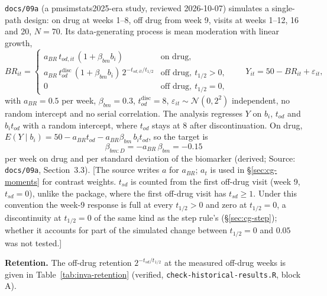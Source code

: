 \documentclass[11pt]{article}
\newcommand{\note}[1]{\textcolor{blue!60!black}{\small [#1]}}
\newcommand{\code}[1]{\texttt{#1}}
\begin{document}
\code{docs/09a} (a pmsimstats2025-era study, reviewed 2026-10-07)
simulates a single-path design: on drug at weeks 1--8, off drug from
week 9, visits at weeks 1--12, 16 and 20, $N = 70$. Its
data-generating process is mean moderation with linear growth,
\begin{equation}
BR_{it} = \begin{cases}
  a_{BR}\, t_{od,it}\,(1 + \beta_{bm} b_i) & \text{on drug}, \\
  a_{BR}\, t_{od}^{\mathrm{disc}}\,(1 + \beta_{bm} b_i)\,
    2^{-t_{sd,it}/t_{1/2}} & \text{off drug},\ t_{1/2} > 0, \\
  0 & \text{off drug},\ t_{1/2} = 0,
\end{cases}
\qquad Y_{it} = 50 - BR_{it} + \varepsilon_{it},
\label{eq:inva-09a-dgp}
\end{equation}
with $a_{BR} = 0.5$ per week, $\beta_{bm} = 0.3$,
$t_{od}^{\mathrm{disc}} = 8$, $\varepsilon_{it} \sim \mathcal N(0, 2^2)$
independent, no random intercept and no serial correlation. The
analysis regresses $Y$ on $b_i$, $t_{od}$ and $b_i t_{od}$ with a random
intercept, where $t_{od}$ stays at 8 after discontinuation. On drug,
$E(Y \mid b_i) = 50 - a_{BR} t_{od} - a_{BR}\beta_{bm}\,b_i t_{od}$, so
the target is
\begin{equation}
\beta_{bm:D} = -a_{BR}\,\beta_{bm} = -0.15
\label{eq:inva-09a-target}
\end{equation}
per week on drug and per standard deviation of the biomarker (derived;
Source: \code{docs/09a}, Section~3.3). \note{The source writes $a$ for
$a_{BR}$; $a_t$ is used in \S\ref{sec:cg-moments} for contrast
weights. $t_{sd}$ is counted from the first off-drug visit (week 9,
$t_{sd} = 0$), unlike the package, where the first off-drug visit has
$t_{sd} \ge 1$. Under this convention the week-9 response is full at
every $t_{1/2} > 0$ and zero at $t_{1/2} = 0$, a discontinuity at
$t_{1/2} = 0$ of the same kind as the step rule's
(\S\ref{sec:cg-step}); whether it accounts for part of the simulated
change between $t_{1/2} = 0$ and $0.05$ was not tested.}

\textbf{Retention.} The off-drug retention $2^{-t_{sd}/t_{1/2}}$ at the
measured off-drug weeks is given in Table~\ref{tab:inva-retention}
(verified, \code{check-historical-results.R}, block A).
\end{document}

